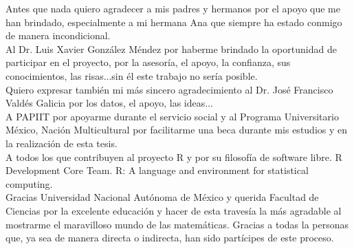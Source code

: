 
\begin{acknowledgements}
\setlength\epigraphrule{0pt}
\thispagestyle{empty}



Antes que nada quiero agradecer a mis padres y hermanos por el apoyo que me han brindado, especialmente a mi hermana Ana que siempre ha estado conmigo de manera incondicional.\\

Al Dr. Luis Xavier González Méndez por haberme brindado la oportunidad de participar en el proyecto, por la asesoría, el apoyo, la confianza, sus conocimientos, las risas...sin él este trabajo no sería posible.\\

Quiero expresar también mi más sincero agradecimiento al  Dr. José Francisco Valdés Galicia por los datos, el apoyo, las ideas...\\

A PAPIIT por apoyarme durante el servicio social y al Programa Universitario México, Nación Multicultural por facilitarme una beca durante mis estudios y en la realización de esta tesis.\\

A todos los que contribuyen al proyecto R y por su filosofía de software libre. R Development Core Team. R: A language and environment for statistical computing.\\

Gracias Universidad Nacional Autónoma de México y querida Facultad de Ciencias por la excelente educación y hacer de esta travesía la más agradable al mostrarme el maravilloso mundo de las matemáticas. Gracias a todas la personas que, ya sea de manera directa o indirecta, han sido partícipes de este proceso. 

\end{acknowledgements}

\newpage
\thispagestyle{empty}




